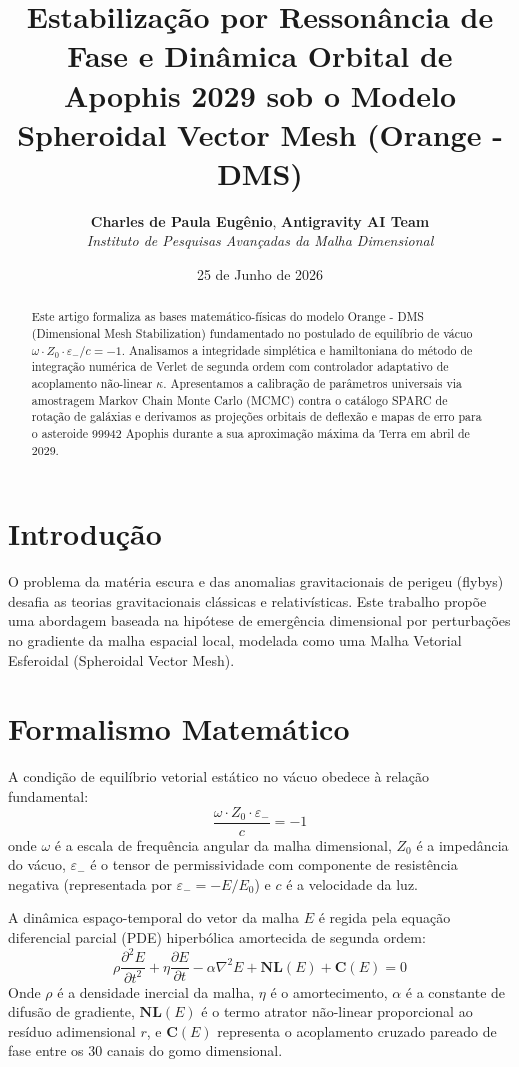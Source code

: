 \documentclass[11pt,twocolumn]{article}
\title{\textbf{Estabilização por Ressonância de Fase e Dinâmica Orbital de Apophis 2029 sob o Modelo Spheroidal Vector Mesh (Orange - DMS)}}
\author{\textbf{Charles de Paula Eugênio}, \textbf{Antigravity AI Team} \\
\textit{Instituto de Pesquisas Avançadas da Malha Dimensional}}
\date{25 de Junho de 2026}
\begin{document}
\maketitle

\begin{abstract}
Este artigo formaliza as bases matemático-físicas do modelo Orange - DMS (Dimensional Mesh Stabilization) fundamentado no postulado de equilíbrio de vácuo $\omega \cdot Z_0 \cdot \varepsilon_- / c = -1$. Analisamos a integridade simplética e hamiltoniana do método de integração numérica de Verlet de segunda ordem com controlador adaptativo de acoplamento não-linear $\kappa$. Apresentamos a calibração de parâmetros universais via amostragem Markov Chain Monte Carlo (MCMC) contra o catálogo SPARC de rotação de galáxias e derivamos as projeções orbitais de deflexão e mapas de erro para o asteroide 99942 Apophis durante a sua aproximação máxima da Terra em abril de 2029.
\end{abstract}

\section{Introdução}
O problema da matéria escura e das anomalias gravitacionais de perigeu (flybys) desafia as teorias gravitacionais clássicas e relativísticas. Este trabalho propõe uma abordagem baseada na hipótese de emergência dimensional por perturbações no gradiente da malha espacial local, modelada como uma Malha Vetorial Esferoidal (Spheroidal Vector Mesh).

\section{Formalismo Matemático}
A condição de equilíbrio vetorial estático no vácuo obedece à relação fundamental:
\begin{equation}
\frac{\omega \cdot Z_0 \cdot \varepsilon_-}{c} = -1
\end{equation}
onde $\omega$ é a escala de frequência angular da malha dimensional, $Z_0$ é a impedância do vácuo, $\varepsilon_-$ é o tensor de permissividade com componente de resistência negativa (representada por $\varepsilon_- = -E/E_0$) e $c$ é a velocidade da luz.

A dinâmica espaço-temporal do vetor da malha $E$ é regida pela equação diferencial parcial (PDE) hiperbólica amortecida de segunda ordem:
\begin{equation}
\rho \frac{\partial^2 E}{\partial t^2} + \eta \frac{\partial E}{\partial t} - \alpha \nabla^2 E + \mathbf{NL}(E) + \mathbf{C}(E) = 0
\end{equation}
Onde $\rho$ é a densidade inercial da malha, $\eta$ é o amortecimento, $\alpha$ é a constante de difusão de gradiente, $\mathbf{NL}(E)$ é o termo atrator não-linear proporcional ao resíduo adimensional $r$, e $\mathbf{C}(E)$ representa o acoplamento cruzado pareado de fase entre os 30 canais do gomo dimensional.
\end{document}
